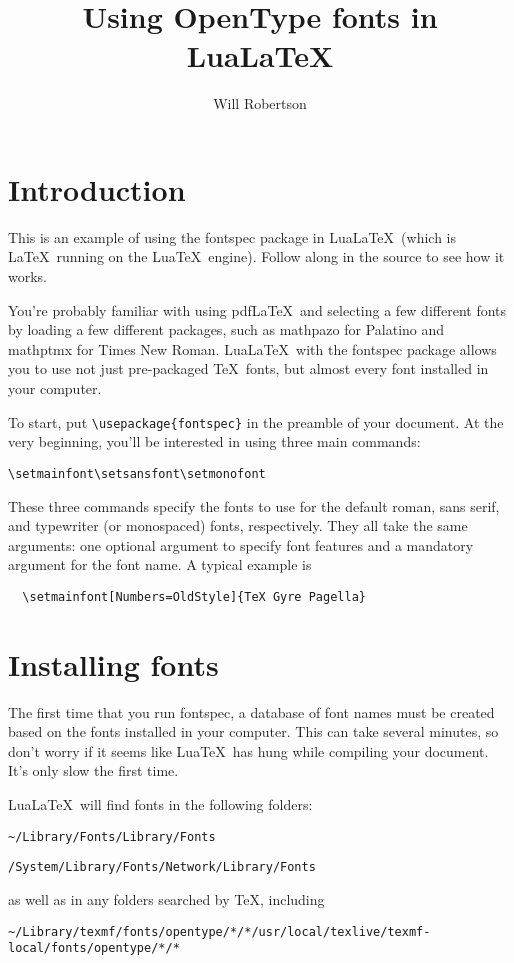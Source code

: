 \documentclass{article}
\begin{document}
\title{Using OpenType fonts in Lua\LaTeX}
\author{Will Robertson}
\maketitle

\section{Introduction}

This is an example of using the \textsf{fontspec} package in Lua\LaTeX\ (which is \LaTeX\ running on the Lua\TeX\ engine). Follow along in the source to see how it works.

You're probably familiar with using pdf\LaTeX\ and selecting a few different fonts by loading a few different packages, such as \textsf{mathpazo} for Palatino and \textsf{mathptmx} for Times New Roman. Lua\LaTeX\ with the \textsf{fontspec} package allows you to use not just pre-packaged \TeX\ fonts, but almost every font installed in your computer.

To start, put \verb|\usepackage{fontspec}| in the preamble of your document. At the very beginning, you'll be interested in using three main commands:
\begin{center}
\verb|\setmainfont|\hfil\verb|\setsansfont|\hfil\verb|\setmonofont|
\end{center}
These three commands specify the fonts to use for the default roman, sans serif, and typewriter (or monospaced) fonts, respectively.
They all take the same arguments: one optional argument to specify font features and a mandatory argument for the font name. A typical example is
\begin{verbatim}
  \setmainfont[Numbers=OldStyle]{TeX Gyre Pagella}
\end{verbatim}

\section{Installing fonts}

The first time that you run \textsf{fontspec}, a database of font names must be created based on the fonts installed in your computer. This can take several minutes, so don't worry if it seems like Lua\TeX\ has hung while compiling your document. It's only slow the first time.

Lua\LaTeX\ will find fonts in the following folders:
\begin{center}
\verb|~/Library/Fonts|\hfil\verb|/Library/Fonts|\par
\verb|/System/Library/Fonts|\hfil\verb|/Network/Library/Fonts|
\end{center}
as well as in any folders searched by \TeX, including
\begin{center}
\verb|~/Library/texmf/fonts/opentype/*/*|\hfil\verb|/usr/local/texlive/texmf-local/fonts/opentype/*/*|
\end{center}
\end{document}
